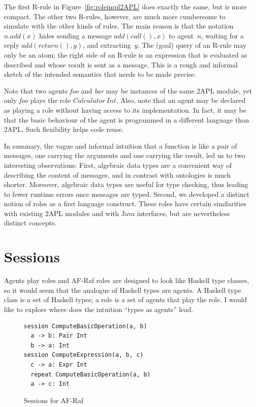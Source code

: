 \documentclass[a4paper,12pt,oneside,fleqn]{book} %
\newcommand{\todo}[1]{[\textcolor{red}{TODO}: #1]}
\begin{document}
The first R-rule in Figure~\ref{fig:roleimpl2APL} does exactly the same,
but is more compact. The other two R-rules, however, are much more
cumbersome to simulate with the other kinds of rules. The main reason is
that the notation $n.\mathit{add}(x)$ hides sending a message
$\mathit{add}(\mathit{call}(),x)$ to agent~$n$, waiting for a reply
$\mathit{add}(\mathit{return}(),y)$, and extracting~$y$. The (goal) query
of an R-rule may only be an atom; the right side of an R-rule is an
expression that is evaluated as described and whose result is sent as a
message.  This is a rough and informal sketch of the intended semantics
that needs to be made precise.

Note that two agents \textit{foo} and \textit{bar} may be instances of the
same 2APL module, yet only \textit{foo} plays the role
$\mathit{Calculator}\,\mathit{Int}$. Also, note that an agent may be
declared as playing a role without having access to its implementation. In
fact, it may be that the basic behaviour of the agent is programmed in a
different language than 2APL. Such flexibility helps code reuse.

In summary, the vague and informal intuition that a function is like a pair
of messages, one carrying the arguments and one carrying the result, led us
to two interesting observations: First, algebraic data types are a
convenient way of describing the content of messages, and in contrast with
ontologies is much shorter. Moreover, algebraic data types are useful for
type checking, thus leading to fewer runtime errors once messages are
typed. Second, we developed a distinct notion of roles as a first language
construct. These roles have certain similarities with existing 2APL modules
and with Java interfaces, but are nevertheless distinct concepts.


\section{Sessions}\label{sec:sessions} %

Agents play roles and AF-Raf roles are designed to look like Haskell type
classes, so it would seem that the analogue of Haskell types are
agents. A Haskell type class is a set of Haskell types; a role is a
set of agents that play the role. I would like to explore where
does the intuition ``types as agents'' lead.

\begin{figure}\footnotesize %
\begin{verbatim}
session ComputeBasicOperation(a, b)
  a -> b: Pair Int
  b -> a: Int
session ComputeExpression(a, b, c)
  c -> a: Expr Int
  repeat ComputeBasicOperation(a, b)
  a -> c: Int
\end{verbatim}
\caption{Sessions for AF-Raf}\label{fig:sessions}
\end{figure} %
\end{document}
